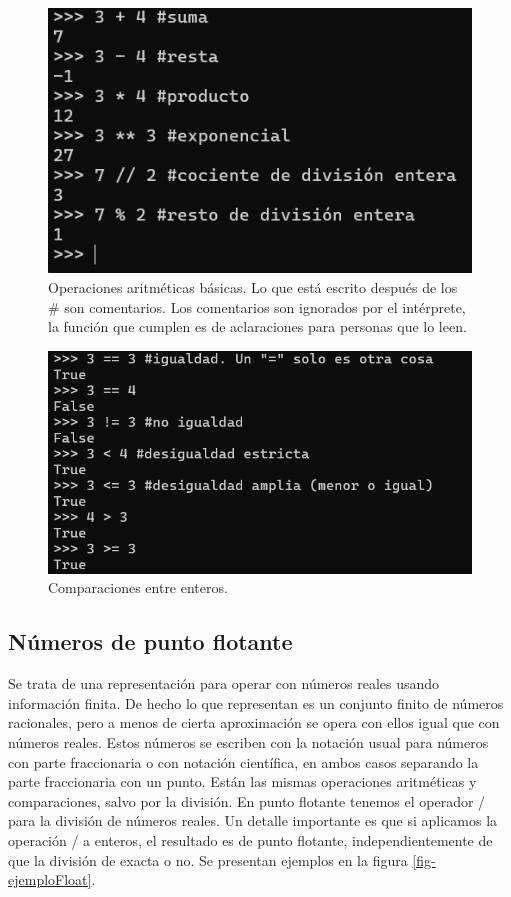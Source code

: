 \documentclass[a4paper, 12pt]{report}
\theoremstyle{definition}
\begin{document}
\begin{figure}
	\centering
	\includegraphics[scale=0.6]{ejemploInt.png}
	\caption{Operaciones aritméticas básicas. Lo que está escrito después de los \# son comentarios. Los comentarios son ignorados por el intérprete, la función que cumplen es de aclaraciones para personas que lo leen.}
	\label{fig-ejemploInt}
\end{figure}

\begin{figure}
	\centering
	\includegraphics[scale=0.6]{ejemploComp.png}
	\caption{Comparaciones entre enteros. }
	\label{fig-ejemploComp}
\end{figure}

\subsection{Números de punto flotante} \label{sec-float}

Se trata de una representación para operar con números reales usando información finita. De hecho lo que representan es un conjunto finito de números racionales, pero a menos de cierta aproximación se opera con ellos igual que con números reales. Estos números se escriben con la notación usual para números con parte fraccionaria o con notación científica, en ambos casos separando la parte fraccionaria con un punto. Están las mismas operaciones aritméticas y comparaciones, salvo por la división. En punto flotante tenemos el operador / para la división de números reales. Un detalle importante es que si aplicamos la operación / a enteros, el resultado es de punto flotante, independientemente de que la división de exacta o no. Se presentan ejemplos en la figura \ref{fig-ejemploFloat}.
\end{document}
